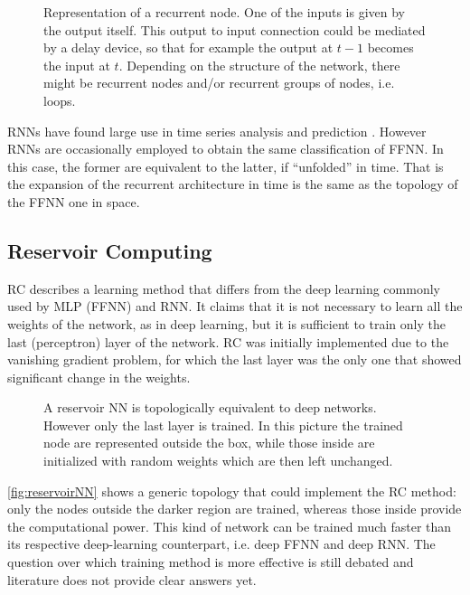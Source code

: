 \begin{figure}[ht]
	\centering
	
	\caption{%
		Representation of a recurrent node.
		One of the inputs is given by the output itself.
		This output to input connection could be mediated by a delay device, so that for example the output at $t-1$ becomes the input at $t$.
		Depending on the structure of the network, there might be recurrent nodes and/or recurrent groups of nodes, i.e. loops.
		}
	\label{fig:RecurrentNN}
\end{figure}

\acsp{RNN} have found large use in time series analysis and prediction \cite{duda2012pattern}.
However \acsp{RNN} are occasionally employed to obtain the same classification of \acs{FFNN}.
In this case, the former are equivalent to the latter, if ``unfolded'' in time.
That is the expansion of the recurrent architecture in time is the same as the topology of the \acs{FFNN} one in space.

\subsection{Reservoir Computing}
\label{ssec:Reservoir_Computing}
\ac{RC} describes a learning method that differs from the deep learning commonly used by \acs{MLP} (\acs{FFNN}) and \acs{RNN}.
It claims that it is not necessary to learn all the weights of the network, as in deep learning, but it is sufficient to train only the last (perceptron) layer of the network.
\acs{RC} was initially implemented due to the vanishing gradient problem, for which the last layer was the only one that showed significant change in the weights.

\begin{figure}[ht]
	\centering
	
	\caption{A reservoir NN is topologically equivalent to deep networks. However only the last layer is trained. In this picture the trained node are represented outside the box, while those inside are initialized with random weights which are then left unchanged.}
	\label{fig:reservoirNN}
\end{figure}

\autoref{fig:reservoirNN} shows a generic topology that could implement the \acs{RC} method: only the nodes outside the darker region are trained, whereas those inside provide the computational power.
This kind of network can be trained much faster than its respective deep-learning counterpart, i.e. deep \acs{FFNN} and deep \acs{RNN}.
The question over which training method is more effective is still debated and literature does not provide clear answers yet.


